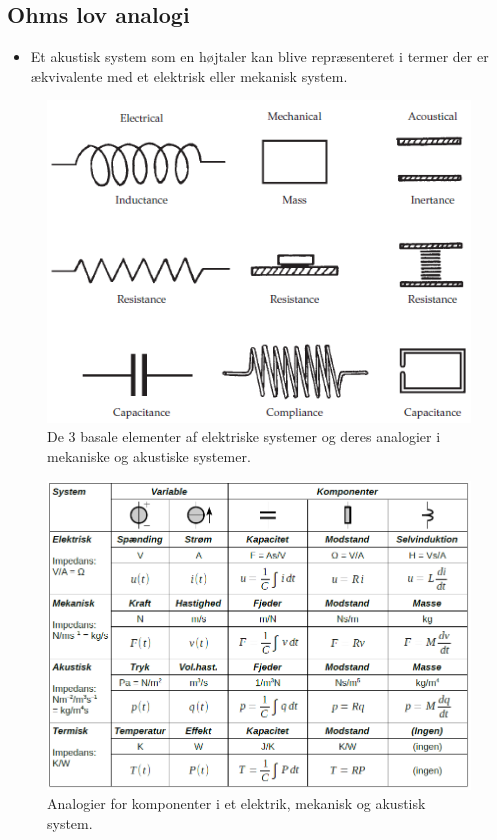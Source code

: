 \subsection{Ohms lov analogi}
\begin{itemize}
	\item Et akustisk system som en højtaler kan blive repræsenteret i termer der er ækvivalente med et elektrisk eller mekanisk system. 
\end{itemize}

\begin{figure} [H]
	\centering
	\includegraphics[width=0.5\linewidth]{graphics/4.png}
	\caption{De 3 basale elementer af elektriske systemer og deres analogier i mekaniske og akustiske systemer.}
	\label{fig:4}
\end{figure}

\begin{figure} [H]
	\centering
	\includegraphics[width=\linewidth]{graphics/5.png}
	\caption{Analogier for komponenter i et elektrik, mekanisk og akustisk system.}
	\label{fig:5}
\end{figure}

